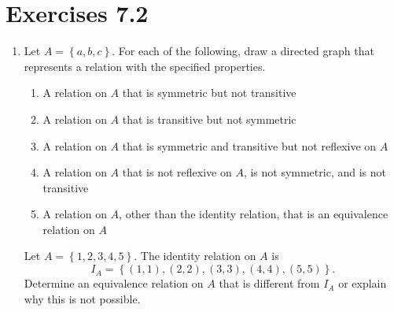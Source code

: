 \section*{Exercises 7.2}
%
\begin{enumerate}
\xitem Let  $A = \left\{ {a, b} \right\}$ and let  
$R = \left\{ {\left( {a, b} \right)} \right\}$. \label{exer:sec72-1}
Is $R$ an equivalence relation on $A$?  If not, is $R$ reflexive, symmetric, or transitive?  Justify all conclusions.

%
%
%
\item Let  $A = \left\{ {a, b, c} \right\}$.  For each of the following, draw a directed graph that represents a relation with the specified properties. \label{exer:sec72examples}

\begin{enumerate}
  \item A relation on  $A$  that is symmetric but not transitive

  \item A relation on  $A$  that is transitive but not symmetric

  \item A relation on  $A$  that is symmetric and transitive but not reflexive \linebreak on  $A$

  \item A relation on  $A$  that is not reflexive on  $A$, is not symmetric, and is not         transitive

  \item A relation on  $A$, other than the identity relation, that is an equivalence relation on          $A$
\end{enumerate}


\xitem Let  $A = \left\{ {1, 2, 3, 4, 5} \right\}$.  The identity relation on  $A$  is  
\[
I_A  = \left\{ {( {1, 1} ), ( {2, 2} ), ( {3, 3} ), ( {4, 4} ), ( {5, 5} )} \right\}.
\]
Determine an equivalence relation on  $A$  that is different from  $I_A $ or explain why this is not possible. \label{exer71:notidentity}



\end{enumerate}
